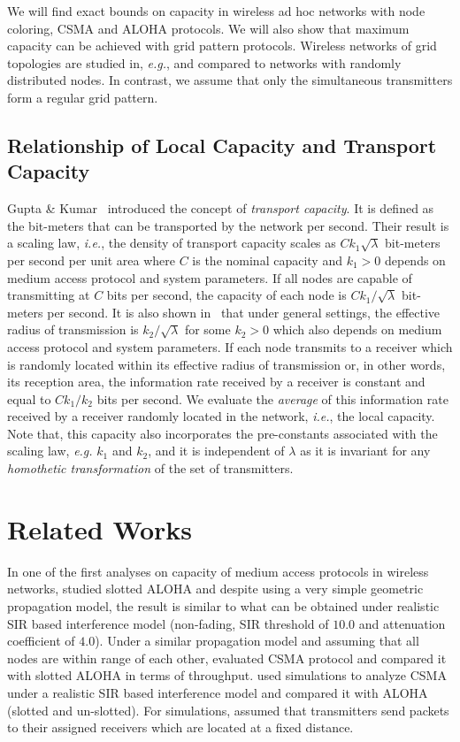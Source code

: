 \documentclass[12pt,english]{article}
\begin{document}
We will find exact bounds on capacity in wireless ad hoc networks with node coloring, CSMA and ALOHA protocols. We will also show that maximum capacity can be achieved with grid pattern protocols. Wireless networks of grid topologies are studied in, {\it e.g.}, \cite{Liu:Haenggi,Hong:Hua} and compared to networks with randomly distributed nodes. In contrast, we assume that only the simultaneous transmitters form a regular grid pattern. 

\subsection{Relationship of Local Capacity and Transport Capacity}

Gupta \& Kumar~\cite{Gupta:Kumar} introduced the concept of {\em transport capacity}. It is defined as the bit-meters that can be transported by the network per second. Their result is a scaling law, {\it i.e.}, the density of transport capacity scales as $Ck_1\sqrt{\lambda}$ bit-meters per second per unit area where $C$ is the nominal capacity and \mbox{$k_1>0$} depends on medium access protocol and system parameters. If all nodes are capable of transmitting at $C$ bits per second, the capacity of each node is $Ck_1/\sqrt{\lambda}$ bit-meters per second. It is also shown in~\cite{Gupta:Kumar} that under general settings, the effective radius of transmission is $k_2/\sqrt{\lambda}$ for some \mbox{$k_2>0$} which also depends on medium access protocol and system parameters. If each node transmits to a receiver which is randomly located within its effective radius of transmission or, in other words, its reception area, the information rate received by a receiver is constant and equal to $Ck_1/k_2$ bits per second. We evaluate the {\em average} of this information rate received by a receiver randomly located in the network, {\it i.e.}, the local capacity. Note that, this capacity also incorporates the pre-constants associated with the scaling law, {\it e.g.} $k_1$ and $k_2$, and it is independent of $\lambda$ as it is invariant for any {\em homothetic transformation} of the set of transmitters. 

\section{Related Works}
\label{sec:context}

In one of the first analyses on capacity of medium access protocols in wireless networks, \cite{Nelson:Kleinrock} studied slotted ALOHA and despite using a very simple geometric propagation model, the result is similar to what can be obtained under realistic SIR based interference model (non-fading, SIR threshold of $10.0$ and attenuation coefficient of $4.0$). Under a similar propagation model and assuming that all nodes are within range of each other, \cite{CSMA} evaluated CSMA protocol and compared it with slotted ALOHA in terms of throughput. \cite{Bartek} used simulations to analyze CSMA under a realistic SIR based interference model and compared it with ALOHA (slotted and un-slotted). For simulations, \cite{Bartek} assumed that transmitters send packets to their assigned receivers which are located at a fixed distance. 
\end{document}
